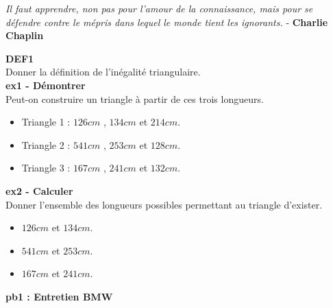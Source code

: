 



\begin{center}
  \textit{Il faut apprendre, non pas pour l'amour de la connaissance, mais pour se défendre contre le mépris dans lequel le monde tient les ignorants.} - \textbf{Charlie Chaplin}
\end{center}

\textbf{DEF1} \\

Donner la définition de l'inégalité triangulaire.\\

\textbf{ex1 - Démontrer} \\

Peut-on construire un triangle à partir de ces trois longueurs.

\begin{itemize}[label={$\bullet$}]
  \item Triangle 1 : $126cm$ , $134cm$  et $214cm$.
  \item Triangle 2 : $541cm$ , $253cm$ et $128cm$.
  \item Triangle 3 : $167cm$ , $241cm$ et $132cm$.
\end{itemize} 

\textbf{ex2 - Calculer} \\

Donner l'ensemble des longueurs possibles permettant au triangle d'exister. 

\begin{itemize}[label={$\bullet$}]
  \item $126cm$ et $134cm$.
  \item $541cm$ et $253cm$.
  \item $167cm$ et $241cm$.
\end{itemize}

\textbf{pb1 : Entretien BMW} \\

